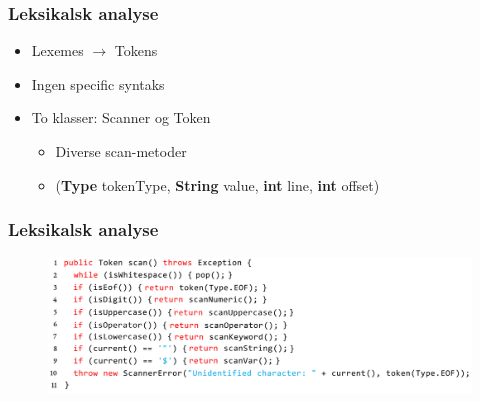 \begin{frame}
  \frametitle{Leksikalsk analyse}

  \begin{itemize}
    \item Lexemes $\rightarrow$ Tokens
    \item Ingen specific syntaks
    \item To klasser: Scanner og Token
      \begin{itemize}
	\item Diverse scan-metoder
	\item (\textbf{Type} tokenType, \textbf{String}
        value, \textbf{int} line, \textbf{int} offset)
      \end{itemize}
      
  \end{itemize}

\end{frame}

  

\begin{frame}
  \frametitle{Leksikalsk analyse}

  \begin{figure}
    \includegraphics[width=1\linewidth]{billeder/scan-metode}
  \end{figure}

\end{frame}

